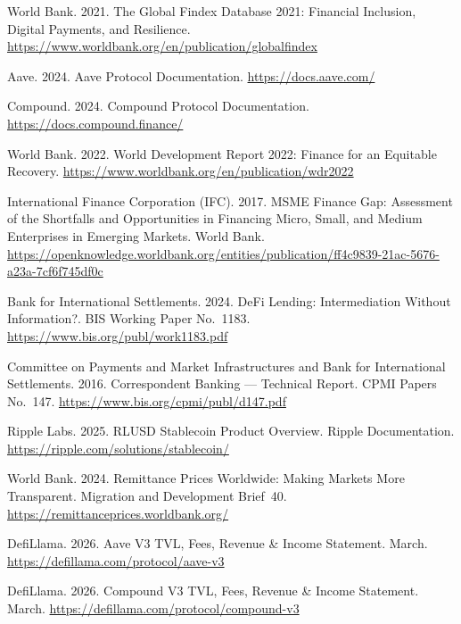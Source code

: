 \documentclass[12pt,a4paper]{report}
\begin{document}
{\begin{enumerate}[label={[\arabic*]}]
\item World Bank. 2021. The Global Findex Database 2021: Financial Inclusion, Digital Payments, and Resilience. \url{https://www.worldbank.org/en/publication/globalfindex}


\item Aave. 2024. Aave Protocol Documentation. \url{https://docs.aave.com/}


\item Compound. 2024. Compound Protocol Documentation. \url{https://docs.compound.finance/}


\item World Bank. 2022. World Development Report 2022: Finance for an Equitable Recovery. \url{https://www.worldbank.org/en/publication/wdr2022}


\item International Finance Corporation (IFC). 2017. MSME Finance Gap: Assessment of the Shortfalls and Opportunities in Financing Micro, Small, and Medium Enterprises in Emerging Markets. World Bank. \url{https://openknowledge.worldbank.org/entities/publication/ff4c9839-21ac-5676-a23a-7cf6f745df0c}


\item Bank for International Settlements. 2024. DeFi Lending: Intermediation Without Information?. BIS Working Paper No.~1183. \url{https://www.bis.org/publ/work1183.pdf}


\item Committee on Payments and Market Infrastructures and Bank for International Settlements. 2016. Correspondent Banking --- Technical Report. CPMI Papers No.~147. \url{https://www.bis.org/cpmi/publ/d147.pdf}


\item Ripple Labs. 2025. RLUSD Stablecoin Product Overview. Ripple Documentation. \url{https://ripple.com/solutions/stablecoin/}


\item World Bank. 2024. Remittance Prices Worldwide: Making Markets More Transparent. Migration and Development Brief~40. \url{https://remittanceprices.worldbank.org/}


\item DefiLlama. 2026. Aave V3 TVL, Fees, Revenue \& Income Statement. March. \url{https://defillama.com/protocol/aave-v3}


\item DefiLlama. 2026. Compound V3 TVL, Fees, Revenue \& Income Statement. March. \url{https://defillama.com/protocol/compound-v3}



\end{enumerate}}
\end{document}
